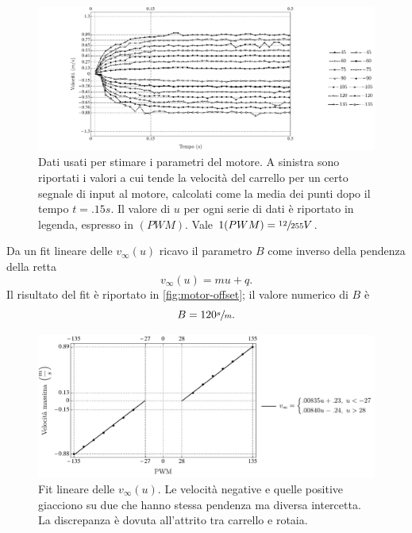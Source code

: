 \begin{figure}[H]
    \centering
    \includegraphics[width=\textwidth]{docs/report/assets/motor-vmax-fit}
    \caption[Dati per stimare i parametri del motore]{Dati usati
    per stimare i parametri del motore. A sinistra sono riportati i valori
    a cui tende la velocità del carrello per un certo segnale di input al
    motore, calcolati come la media dei punti dopo il tempo $t = .15s$.
    Il valore di $u$ per ogni serie di dati è riportato in legenda, espresso
    in $(PWM)$. Vale $1 (PWM) = \sfrac {12}{255}V$.
    }
    \label{fig:motor-vmax-fit}
\end{figure}

Da un fit lineare delle $v_\infty(u)$ ricavo il parametro $B$ come inverso
della pendenza della retta
\begin{equation}
    v_\infty(u) = m u + q.
    \label{eq:vinfmuq}
\end{equation}
Il risultato del fit è riportato in \autoref{fig:motor-offset}; il valore
numerico di $B$ è
\begin{equation*}
    B = 120 \sfrac s m.
\end{equation*}

\begin{figure}[H]
    \centering
    \includegraphics[width=\textwidth]{docs/report/assets/motor-offset}
    \caption[Fit lineare delle velocità asintotiche del carrello]{
    Fit lineare delle $v_{\infty}(u)$. Le velocità negative e quelle positive
    giacciono su due che hanno stessa pendenza ma diversa intercetta.
    La discrepanza è dovuta all'attrito tra carrello e rotaia.
    }
    \label{fig:motor-offset}
\end{figure}

